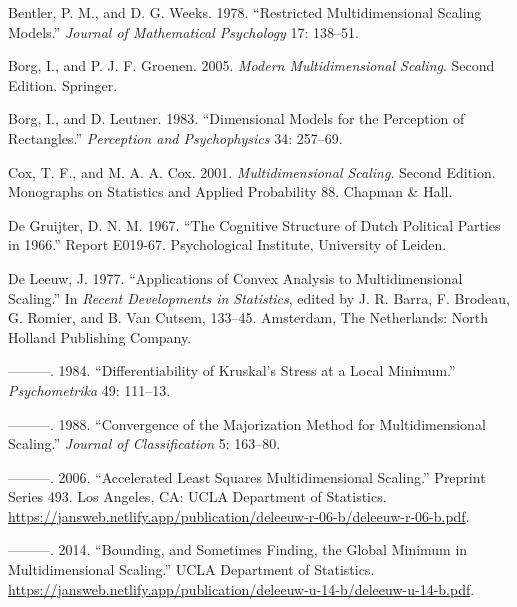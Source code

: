 \documentclass[
  12pt,
]{article}
\newlength{\cslhangindent}
\newenvironment{CSLReferences}[2] %
 {\begin{list}{}{%
  \setlength{\itemindent}{0pt}
  \setlength{\leftmargin}{0pt}
  \setlength{\parsep}{0pt}
  \ifodd #1
   \setlength{\leftmargin}{\cslhangindent}
   \setlength{\itemindent}{-1\cslhangindent}
  \fi
  \setlength{\itemsep}{#2\baselineskip}}}
 {\end{list}}
\begin{document}
\label{refs}
\begin{CSLReferences}{1}{0}
Bentler, P. M., and D. G. Weeks. 1978. {``Restricted Multidimensional Scaling Models.''} \emph{Journal of Mathematical Psychology} 17: 138--51.

Borg, I., and P. J. F. Groenen. 2005. \emph{Modern Multidimensional Scaling}. Second Edition. Springer.

Borg, I., and D. Leutner. 1983. {``{Dimensional Models for the Perception of Rectangles}.''} \emph{Perception and Psychophysics} 34: 257--69.

Cox, T. F., and M. A. A. Cox. 2001. \emph{Multidimensional Scaling}. Second Edition. Monographs on Statistics and Applied Probability 88. Chapman \& Hall.

De Gruijter, D. N. M. 1967. {``{The Cognitive Structure of Dutch Political Parties in 1966}.''} Report E019-67. Psychological Institute, University of Leiden.

De Leeuw, J. 1977. {``Applications of Convex Analysis to Multidimensional Scaling.''} In \emph{Recent Developments in Statistics}, edited by J. R. Barra, F. Brodeau, G. Romier, and B. Van Cutsem, 133--45. Amsterdam, The Netherlands: North Holland Publishing Company.

---------. 1984. {``{Differentiability of Kruskal's Stress at a Local Minimum}.''} \emph{Psychometrika} 49: 111--13.

---------. 1988. {``Convergence of the Majorization Method for Multidimensional Scaling.''} \emph{Journal of Classification} 5: 163--80.

---------. 2006. {``{Accelerated Least Squares Multidimensional Scaling}.''} Preprint Series 493. Los Angeles, CA: UCLA Department of Statistics. \url{https://jansweb.netlify.app/publication/deleeuw-r-06-b/deleeuw-r-06-b.pdf}.

---------. 2014. {``{Bounding, and Sometimes Finding, the Global Minimum in Multidimensional Scaling}.''} UCLA Department of Statistics. \url{https://jansweb.netlify.app/publication/deleeuw-u-14-b/deleeuw-u-14-b.pdf}.


\end{CSLReferences}
\end{document}
